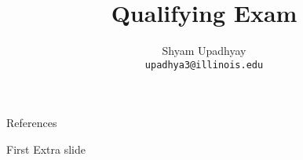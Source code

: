 

\author{Shyam Upadhyay \\ {\tt upadhya3@illinois.edu}}
\title{Qualifying Exam}

\date{} 



\begin{frame}
\titlepage
\end{frame}






\begin{frame}[allowframebreaks]{References}
\def\newblock{}


\end{frame}
\appendix
\begin{frame}{First Extra slide}
\end{frame}

